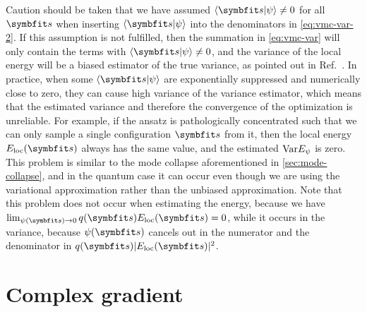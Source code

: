 Caution should be taken that we have assumed $\ip{\vs}{\psi} \neq 0$ for all $\vs$ when inserting $\ip{\vs}{\psi}$ into the denominators in \cref{eq:vmc-var-2}. If this assumption is not fulfilled, then the summation in \cref{eq:vmc-var} will only contain the terms with $\ip{\vs}{\psi} \neq 0$, and the variance of the local energy will be a biased estimator of the true variance, as pointed out in Ref.~\cite{sinibaldi2023unbiasing}. In practice, when some $\ip{\vs}{\psi}$ are exponentially suppressed and numerically close to zero, they can cause high variance of the variance estimator, which means that the estimated variance and therefore the convergence of the optimization is unreliable. For example, if the ansatz is pathologically concentrated such that we can only sample a single configuration $\vs$ from it, then the local energy $E_\text{loc}(\vs)$ always has the same value, and the estimated $\mathrm{Var} E_\psi$ is zero. This problem is similar to the mode collapse aforementioned in \cref{sec:mode-collapse}, and in the quantum case it can occur even though we are using the variational approximation rather than the unbiased approximation. Note that this problem does not occur when estimating the energy, because we have $\lim_{\psi(\vs) \to 0} q(\vs) E_\text{loc}(\vs) = 0$, while it occurs in the variance, because $\psi(\vs)$ cancels out in the numerator and the denominator in $q(\vs) |E_\text{loc}(\vs)|^2$.

\section{Complex gradient}
\label{sec:cmpl-grad}

